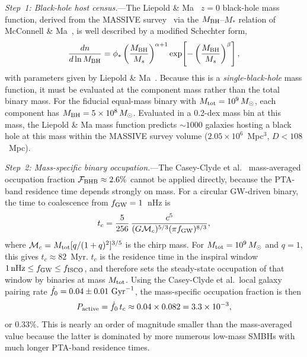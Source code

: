 \documentclass[aps,prx,twocolumn,superscriptaddress,nofootinbib,longbibliography]{revtex4-2}
\begin{document}
\textit{Step~1: Black-hole host census.}---The Liepold \& Ma~\cite{LiepoldMa2024} $z=0$ black-hole mass function, derived from the MASSIVE survey~\cite{Ma2014} via the $M_{\rm BH}$--$M_*$ relation of McConnell \& Ma~\cite{McConnellMa2013}, is well described by a modified Schechter form,
\begin{equation}\label{eq:bhmf}
\frac{dn}{d\ln M_{\rm BH}}
=
\phi_*
\left(\frac{M_{\rm BH}}{M_s}\right)^{\alpha+1}
\exp\!\left[-\left(\frac{M_{\rm BH}}{M_s}\right)^{\beta}\right],
\end{equation}
with parameters given by Liepold \& Ma~\cite{LiepoldMa2024}. Because this is a \emph{single-black-hole} mass function, it must be evaluated at the component mass rather than the total binary mass. For the fiducial equal-mass binary with $M_{\rm tot}=10^9\,M_\odot$, each component has $M_{\rm BH}=5\times10^8\,M_\odot$. Evaluated in a 0.2-dex mass bin at this mass, the Liepold \& Ma mass function predicts $\sim1000$ galaxies hosting a black hole at this mass within the MASSIVE survey volume ($2.05\times10^6$~Mpc$^3$, $D<108$~Mpc).

\textit{Step~2: Mass-specific binary occupation.}---The Casey-Clyde et al.~\cite{CaseyClyde2025} mass-averaged occupation fraction $\mathcal{F}_{\rm BHB}\approx2.6\%$ cannot be applied directly, because the PTA-band residence time depends strongly on mass. For a circular GW-driven binary, the time to coalescence from $f_{\rm GW}=1$~nHz is
\begin{equation}\label{eq:tc}
t_c = \frac{5}{256}\,
\frac{c^5}{(G\mathcal{M}_c)^{5/3}(\pi f_{\rm GW})^{8/3}},
\end{equation}
where $\mathcal{M}_c=M_{\rm tot}[q/(1+q)^2]^{3/5}$ is the chirp mass. For $M_{\rm tot}=10^9\,M_\odot$ and $q=1$, this gives $t_c\approx82$~Myr. $t_c$ is the residence time in the inspiral window $1\,{\rm nHz}\le f_{\rm GW}\le f_{\rm ISCO}$, and therefore sets the steady-state occupation of that window by binaries at mass $M_{\rm tot}$. Using the Casey-Clyde et al.\ local galaxy pairing rate $\dot f_0=0.04\pm0.01~{\rm Gyr}^{-1}$, the mass-specific occupation fraction is then
\begin{equation}\label{eq:Pactive}
P_{\rm active} = \dot f_0\,t_c \approx 0.04\times0.082 = 3.3\times10^{-3},
\end{equation}
or $0.33\%$. This is nearly an order of magnitude smaller than the mass-averaged value because the latter is dominated by more numerous low-mass SMBHs with much longer PTA-band residence times.
\end{document}
